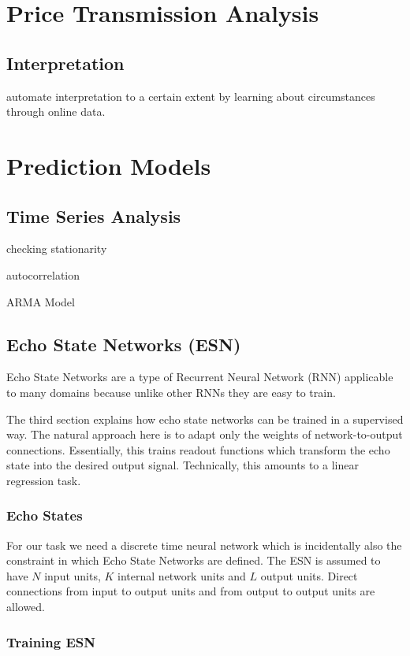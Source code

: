 \section*{Price Transmission Analysis}

\subsection*{Interpretation}
automate interpretation to a certain extent by learning about circumstances through online data.

\section*{Prediction Models}

\subsection*{Time Series Analysis}
checking stationarity

autocorrelation

ARMA Model

\subsection*{Echo State Networks (ESN)}
Echo State Networks are a type of Recurrent Neural Network (RNN) applicable to many domains because unlike other RNNs they are easy to train.

\cite{jaeger_echo_state_RNN}
The third section explains how echo state networks can be trained in a
supervised way. The natural approach here is to adapt only the weights
of network-to-output connections. Essentially, this trains readout functions
which transform the echo state into the desired output signal. Technically,
this amounts to a linear regression task.

\subsubsection*{Echo States}
For our task we need a discrete time neural network which is incidentally also the constraint in which Echo State Networks are defined. The ESN is assumed to have $N$ input units, $K$ internal network units and $L$ output units. Direct connections from input to output units and from output to output units are allowed.

\subsubsection*{Training ESN}


